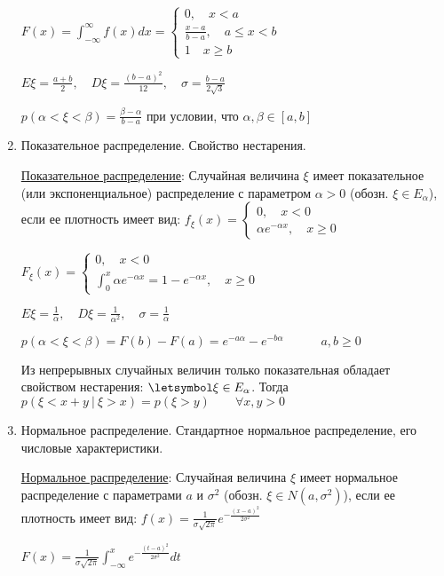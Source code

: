 \begin{enumerate}
    $F(x) = \int_{-\infty}^\infty f(x)dx = \begin{cases}0, \quad x < a \\ \frac{x - a}{b - a}, \quad a \leq x < b \\ 1 \quad x \geq b\end{cases}$

    $E\xi = \frac{a + b}{2}, \quad D\xi = \frac{(b - a)^2}{12}, \quad \sigma = \frac{b - a}{2\sqrt{3}}$

    $p(\alpha < \xi < \beta) = \frac{\beta - \alpha}{b - a}$ при условии, что $\alpha, \beta \in [a, b]$

    \item Показательное распределение. Свойство нестарения.

    \hyperlink{exponentialdistribution}{Показательное распределение}: Случайная величина $\xi$ имеет показательное (или экспоненциальное) распределение с параметром $\alpha > 0$ (обозн. $\xi \in E_\alpha$),
    если ее плотность имеет вид: $f_\xi(x) = \begin{cases}0, \quad x < 0 \\ \alpha e^{-\alpha x}, \quad x \geq 0\end{cases}$

    $F_\xi(x) = \begin{cases}0, \quad x < 0 \\ \int_0^x \alpha e^{-\alpha x} = 1 - e^{-\alpha x}, \quad x \geq 0\end{cases}$

    $E\xi = \frac{1}{\alpha}, \quad D\xi = \frac{1}{\alpha^2}, \quad \sigma = \frac{1}{\alpha}$

    $p(\alpha < \xi < \beta) = F(b) - F(a) = e^{-a\alpha} - e^{-b\alpha} \quad\quad\quad a, b \geq 0$

    Из непрерывных случайных величин только показательная обладает свойством нестарения:
    \Ths $\letsymbol \xi \in E_\alpha$. Тогда $p(\xi < x + y \ | \ \xi > x) = p(\xi > y) \quad\quad \forall x, y > 0$

    \item Нормальное распределение. Стандартное нормальное распределение, его числовые характеристики.

    \hyperlink{normaldistribution}{Нормальное распределение}: Случайная величина $\xi$ имеет нормальное распределение с параметрами $a$ и $\sigma^2$ (обозн. $\xi \in N(a, \sigma^2)$), если
    ее плотность имеет вид: $f(x) = \frac{1}{\sigma \sqrt{2\pi}} e^{-\frac{(x - a)^2}{2\sigma^2}}$

    $F(x) = \frac{1}{\sigma \sqrt{2\pi}} \int_{-\infty}^x e^{-\frac{(t - a)^2}{2\sigma^2}} dt$


\end{enumerate}
